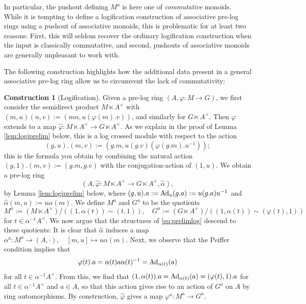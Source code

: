 \documentclass[a4paper,10pt%
]{amsart}
\numberwithin{equation}{section}
\theoremstyle{definition}
\newtheorem{construction}[subsection]{Construction}
\renewcommand{\:}{\colon}
\begin{document}
In particular, the pushout defining $M^a$ is here one of \emph{commutative} monoids. While it is tempting to define a logification construction of associative pre-log rings using a pushout of associative monoids, this is problematic for at least two reasons: First, this will seldom recover the ordinary logification construction when the input is classically commutative, and second, pushouts of associative monoids are generally unpleasant to work with. 

The following construction highlights how the additional data present in a general associative pre-log ring allow us to circumvent the lack of commutativity: 

\begin{construction}[Logification]\label{constr:logification} Given a pre-log ring $(A, \varphi \colon M \to G)$, we first consider the semidirect product $M \ltimes A^\times$ with $(m, u)(n, v) := (mn, u(\varphi(m).v))$, and similarly for $G \ltimes A^\times$. Then $\varphi$ extends to a map $\hat{\varphi} \colon M \ltimes A^\times \to G \ltimes A^\times$. As we explain in the proof of Lemma \ref{lem:logiprelim} below, this is a log crossed module with respect to the action \begin{equation}\label{eq:prelimcrossed}(g, u).(m, v) := (g.m, u(g.v)(\varphi(g.m).u^{-1}));\end{equation} this is the formula you obtain by combining the natural action $(g, 1).(m, v) := (g.m, g.v)$ with the conjugation-action of $(1, u)$. We obtain a pre-log ring \begin{equation}\label{eq:prelimlog}(A, \hat{\varphi} \colon M \ltimes A^\times \to G \ltimes A^\times, \hat{\alpha}),\end{equation} by Lemma \ref{lem:logiprelim} below, where $(g, u).a := {\rm Ad}_u(g.a) := u(g.a)u^{-1}$ and $\hat{\alpha}(m, u) := u\alpha(m)$. We define $M^a$ and $G^a$ to be the quotients \[M^a := (M \ltimes A^\times)/((1, \alpha(t)) \sim (t, 1)), \quad G^a := (G \ltimes A^\times)/((1, \alpha(t)) \sim (\varphi(t), 1))\] for $t \in \alpha^{-1}A^\times$. We now argue that the structures of \eqref{eq:prelimlog} descend to these quotients: It is clear that $\hat{\alpha}$ induces a map $\alpha^a \colon M^a \to (A, \cdot), \quad [m, u] \mapsto u\alpha(m)$. Next, we observe that the Peiffer condition implies that \[\varphi(t).a = \alpha(t)a\alpha(t)^{-1} = {\rm Ad}_{\alpha(t)}(a)\] for all $t \in \alpha^{-1}A^\times$. From this, we find that $(1, \alpha(t)).a = {\rm Ad}_{\alpha(t)}(a) = (\varphi(t), 1).a$ for all $t \in \alpha^{-1}A^\times$ and $a \in A$, so that this action gives rise to an action of $G^a$ on $A$ by ring automorphisms. By construction, $\hat{\varphi}$ gives a map $\varphi^a \colon M^a \to G^a$.


\end{construction}
\end{document}
